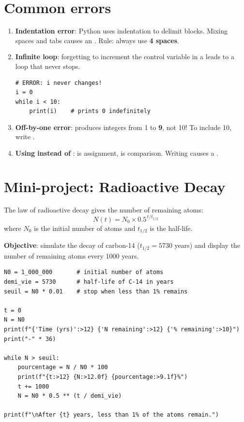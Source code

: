 \section{Common errors}

\begin{errmark}
\begin{enumerate}
    \item \textbf{Indentation error}: Python uses indentation to delimit
    blocks. Mixing spaces and tabs causes an .
    Rule: always use \textbf{4 spaces}.

    \item \textbf{Infinite loop}: forgetting to increment the control variable
    in a  leads to a loop that never stops.
    \begin{verbatim}
# ERROR: i never changes!
i = 0
while i < 10:
    print(i)    # prints 0 indefinitely
    \end{verbatim}

    \item \textbf{Off-by-one error}:  produces
    integers from 1 to \textbf{9}, not 10! To include 10, write .

    \item \textbf{Using \py{=} instead of \py{==}}: \py{=} is assignment,
    \py{==} is comparison. Writing  causes a .
\end{enumerate}
\end{errmark}

\section{Mini-project: Radioactive Decay}

\begin{projet}
The law of radioactive decay gives the number
of remaining atoms:
\[
    N(t) = N_0 \times 0.5^{\,t / t_{1/2}}
\]
where $N_0$ is the initial number of atoms and $t_{1/2}$ is the half-life.

\textbf{Objective}: simulate the decay of carbon-14 ($t_{1/2} = 5730$ years)
and display the number of remaining atoms every 1000 years.
\end{projet}

\begin{codeblock}[title=\textbf{Python}]
\begin{verbatim}
N0 = 1_000_000       # initial number of atoms
demi_vie = 5730      # half-life of C-14 in years
seuil = N0 * 0.01    # stop when less than 1% remains

t = 0
N = N0
print(f"{'Time (yrs)':>12} {'N remaining':>12} {'% remaining':>10}")
print("-" * 36)

while N > seuil:
    pourcentage = N / N0 * 100
    print(f"{t:>12} {N:>12.0f} {pourcentage:>9.1f}%")
    t += 1000
    N = N0 * 0.5 ** (t / demi_vie)

print(f"\nAfter {t} years, less than 1% of the atoms remain.")
\end{verbatim}
\end{codeblock}

